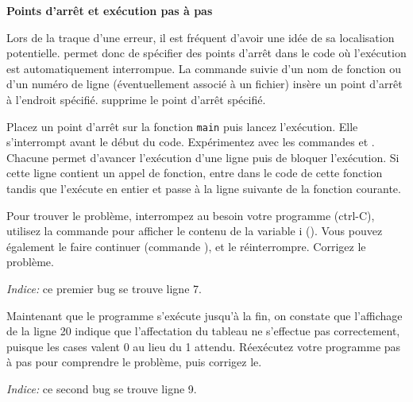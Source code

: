 \documentclass[10pt]{article}\usepackage[nu]{esial}
\begin{document}
\begin{Exercice}
  \smallskip
  \noindent \textbf{Points d'arrêt et exécution pas à pas}

  Lors de la traque d'une erreur, il est fréquent d'avoir une idée de sa
  localisation potentielle.  permet donc de spécifier des points
  d'arrêt dans le code où l'exécution est automatiquement interrompue.  La
  commande  suivie d'un nom de fonction ou d'un numéro de ligne
  (éventuellement associé à un fichier) insère un point d'arrêt à l'endroit
  spécifié.  supprime le point d'arrêt spécifié.

  Placez un point d'arrêt sur la fonction \texttt{main} puis lancez
  l'exécution. Elle s'interrompt avant le début du code.  Expérimentez avec les
  commandes  et . Chacune permet d'avancer l'exécution
  d'une ligne puis de bloquer l'exécution.  Si cette ligne contient un appel de
  fonction,  entre dans le code de cette fonction tandis que
   l'exécute en entier et passe à la ligne suivante de la fonction
  courante.

  \Question Pour trouver le problème, interrompez au besoin votre programme
  (ctrl-C), utilisez la commande  pour afficher le contenu de la
  variable i (). Vous pouvez également le faire continuer
  (commande ), et le réinterrompre. Corrigez le problème.

  \textit{Indice:} ce premier bug se trouve ligne 7.

  \Question Maintenant que le programme s'exécute jusqu'à la fin, on constate
  que l'affichage de la ligne 20 indique que l'affectation du tableau ne
  s'effectue pas correctement, puisque les cases valent 0 au lieu du 1
  attendu. Réexécutez votre programme pas à pas pour comprendre le problème,
  puis corrigez le.

  \textit{Indice:} ce second bug se trouve ligne 9.
\end{Exercice}
\end{document}
